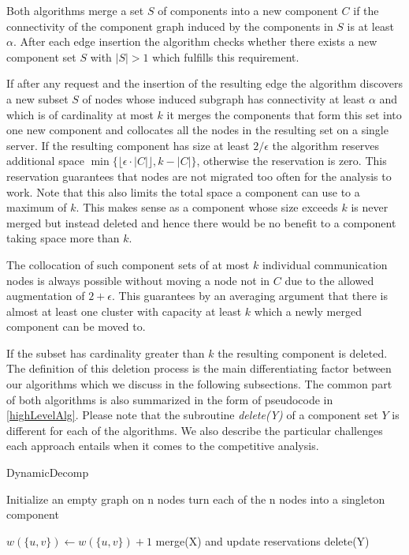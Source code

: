 \documentclass[a4paper,xcolor=dvipsnames, tikz, 12pt]{article}
\theoremstyle{definition}
\begin{document}
	Both algorithms merge a set $S$ of components into a new component $C$ if the connectivity of the component graph induced by the components in $S$ is at least $\alpha$. After each edge insertion the algorithm checks whether there exists a new component set $S$ with $|S|>1$ which fulfills this requirement.
	
	If after any request and the insertion of the resulting edge the algorithm discovers a new subset $S$ of nodes whose induced subgraph has connectivity at least $\alpha$ and which is of cardinality at most $k$ it merges the components that form this set into one new component and collocates all the nodes in the resulting set on a single server. If the resulting component has size at least $2/\epsilon$ the algorithm reserves additional space $\min\{\lfloor\epsilon\cdot|C|\rfloor,k-|C|\}$, otherwise the reservation is zero. This reservation guarantees that nodes are not migrated too often for the analysis to work. Note that this also limits the total space a component can use to a maximum of $k$. This makes sense as a component whose size exceeds $k$ is never merged but instead deleted and hence there would be no benefit to a component taking space more than $k$.
	
	The collocation of such component sets of at most $k$ individual communication nodes is always possible without moving a node not in $C$ due to the allowed augmentation of $2+\epsilon$. This guarantees by an averaging argument that there is almost at least one cluster with capacity at least $k$ which a newly merged component can be moved to.
	
	If the subset has cardinality greater than $k$ the resulting component is deleted. The definition of this deletion process is the main differentiating factor between our algorithms which we discuss in the following subsections. The common part of both algorithms is also summarized in the form of pseudocode in \cref{highLevelAlg}. Please note that the subroutine \textit{delete(Y)} of a component set $Y$ is different for each of the algorithms. We also describe the particular challenges each approach entails when it comes to the competitive analysis.
	
	\begin{algorithm}
		\caption{DynamicDecomp}
		\label{highLevelAlg}
		\begin{algorithmic}
			\STATE Initialize an empty graph on n nodes
			\STATE turn each of the n nodes into a singleton component
			
			\STATE $w(\{u,v\})\gets w(\{u,v\})+1$
			\ENDIF
			\STATE merge(X) and update reservations %
			\ENDIF
			\STATE delete(Y)
			\ENDIF	
			
			\ENDFOR
			
		\end{algorithmic}
	\end{algorithm}
	
\end{document}
